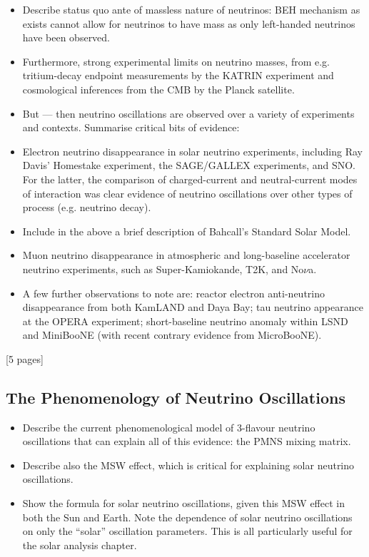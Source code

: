 {
\color{blue}
\begin{itemize}
    \item Describe status quo ante of massless nature of neutrinos: BEH mechanism as exists cannot allow for neutrinos to have mass as only left-handed neutrinos have been observed.
    \item Furthermore, strong experimental limits on neutrino masses, from e.g. tritium-decay endpoint measurements by the KATRIN experiment and cosmological inferences from the CMB by the Planck satellite.
    \item But --- then neutrino oscillations are observed over a variety of experiments and contexts. Summarise critical bits of evidence:
    \item Electron neutrino disappearance in solar neutrino experiments, including Ray Davis' Homestake experiment, the SAGE/GALLEX experiments, and SNO. For the latter, the comparison of charged-current and neutral-current modes of interaction was clear evidence of neutrino oscillations over other types of process (e.g. neutrino decay).
    \item Include in the above a brief description of Bahcall's Standard Solar Model.
    \item Muon neutrino disappearance in atmospheric and long-baseline accelerator neutrino experiments, such as Super-Kamiokande, T2K, and No$\nu$a.
    \item A few further observations to note are: reactor electron anti-neutrino disappearance from both KamLAND and Daya Bay; tau neutrino appearance at the OPERA experiment; short-baseline neutrino anomaly within LSND and MiniBooNE (with recent contrary evidence from MicroBooNE).
\end{itemize}
[5 pages]
\subsection{The Phenomenology of Neutrino Oscillations}\label{sec:nu_osc_phenom}
\begin{itemize}
    \item Describe the current phenomenological model of 3-flavour neutrino oscillations that can explain all of this evidence: the PMNS mixing matrix.
    \item Describe also the MSW effect, which is critical for explaining solar neutrino oscillations.
    \item Show the formula for solar neutrino oscillations, given this MSW effect in both the Sun and Earth. Note the dependence of solar neutrino oscillations on only the ``solar'' oscillation parameters. This is all particularly useful for the solar analysis chapter.
\end{itemize}

}
